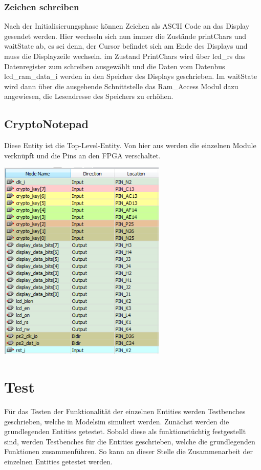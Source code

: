 \documentclass[a4paper,12pt]{report}
\begin{document}
		\subsection{Zeichen schreiben}
			Nach der Initialisierungsphase können Zeichen als ASCII Code an das Display gesendet werden. Hier wechseln sich nun immer die Zustände printChars und waitState ab, es sei denn, der Cursor befindet sich am Ende des Displays und muss die Displayzeile wechseln.
			im Zustand PrintChars wird über lcd\_rs das Datenregister zum schreiben ausgewählt und die Daten vom Datenbus lcd\_ram\_data\_i werden in den Speicher des Displays geschrieben. Im waitState wird dann über die ausgehende Schnittstelle das Ram\_Access Modul dazu angewiesen, die Leseadresse des Speichers zu erhöhen. 
		\pagebreak
	\section{CryptoNotepad}
		Diese Entity ist die Top-Level-Entity.
		Von hier aus werden die einzelnen Module verknüpft und die Pins an den FPGA verschaltet.
		\begin{center}
			\includegraphics[width=0.6\textwidth]{assets/io}
		\end{center}
		

\chapter{Test}
	Für das Testen der Funktionalität der einzelnen Entities werden Testbenches geschrieben, welche in Modelsim simuliert werden.
	Zunächst werden die grundlegenden Entities getestet. Sobald diese als funktionstüchtig festgestellt sind, werden Testbenches für die Entities geschrieben, welche die grundlegenden Funktionen zusammenführen. So kann an dieser Stelle die Zusammenarbeit der einzelnen Entities getestet werden.
	
\end{document}
